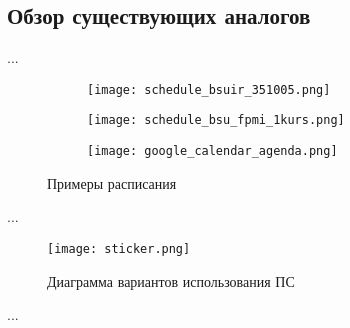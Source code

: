 \subsection{Обзор существующих аналогов}
\label{sec:analysis:analogues}

...

\begin{sidewaysfigure}
\centering
	\begin{subfigure}[b]{0.3\textwidth}
	    \centering
		\texttt{[image: schedule\_bsuir\_351005.png]} 
		\caption{}
		\label{fig:analysis:analogues:bsuir}
	\end{subfigure}
	\begin{subfigure}[b]{0.3\textwidth}
	    \centering
		\texttt{[image: schedule\_bsu\_fpmi\_1kurs.png]}
		\caption{}
		\label{fig:analysis:analogues:bsu_fpmi}
	\end{subfigure}
	\begin{subfigure}[b]{0.3\textwidth}
	    \centering
		\texttt{[image: google\_calendar\_agenda.png]} 
		\caption{}
		\label{fig:analysis:analogues:google_calendar}
	\end{subfigure}
	\caption{Примеры расписания}
\end{sidewaysfigure}

...

\begin{figure}
\centering
	\texttt{[image: sticker.png]}
	\caption{Диаграмма вариантов использования ПС}
	\label{sec:domain:horse}
\end{figure}

...
